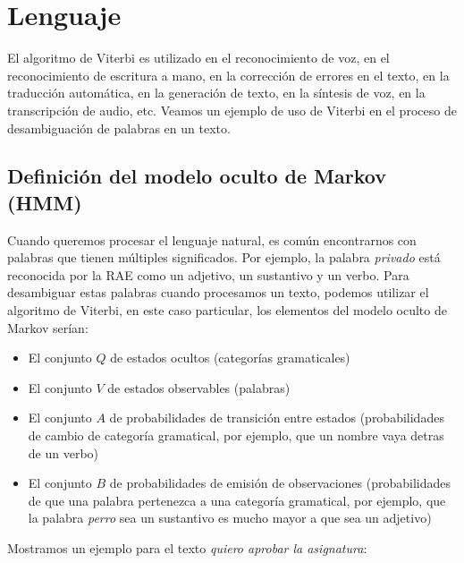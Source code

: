 \documentclass[11pt,openany]{book}
\begin{document}
\section{Lenguaje}
El algoritmo de Viterbi es utilizado en el reconocimiento de voz, en el reconocimiento
de escritura a mano, en la corrección de errores en el texto, en la traducción automática,
en la generación de texto, en la síntesis de voz, en la transcripción de audio, etc. Veamos
un ejemplo de uso de Viterbi en el proceso de desambiguación de palabras en un texto.
\subsection*{Definición del modelo oculto de Markov (HMM)}

Cuando queremos procesar el lenguaje natural, es común encontrarnos con palabras que tienen
múltiples significados. Por ejemplo, la palabra \textit{privado} está reconocida por la RAE como 
un adjetivo, un sustantivo y un verbo. Para desambiguar estas palabras cuando procesamos
un texto, podemos utilizar el algoritmo de Viterbi, en este caso particular, 
los elementos del modelo oculto de Markov serían:
\begin{itemize}
      \boldmath
      \item El conjunto $Q$ de estados ocultos (categorías gramaticales)
      \item El conjunto $V$ de estados observables (palabras)
      \item El conjunto $A$ de probabilidades de transición entre estados (probabilidades de cambio de categoría gramatical, por ejemplo, que un nombre vaya detras de un verbo)
      \item El conjunto $B$ de probabilidades de emisión de observaciones (probabilidades de que una palabra pertenezca a una categoría gramatical, por ejemplo, 
      que la palabra \textit{perro} sea un sustantivo es mucho mayor a que sea un adjetivo)
\end{itemize}
Mostramos un ejemplo para el texto \textit{quiero aprobar la asignatura}:
\end{document}

